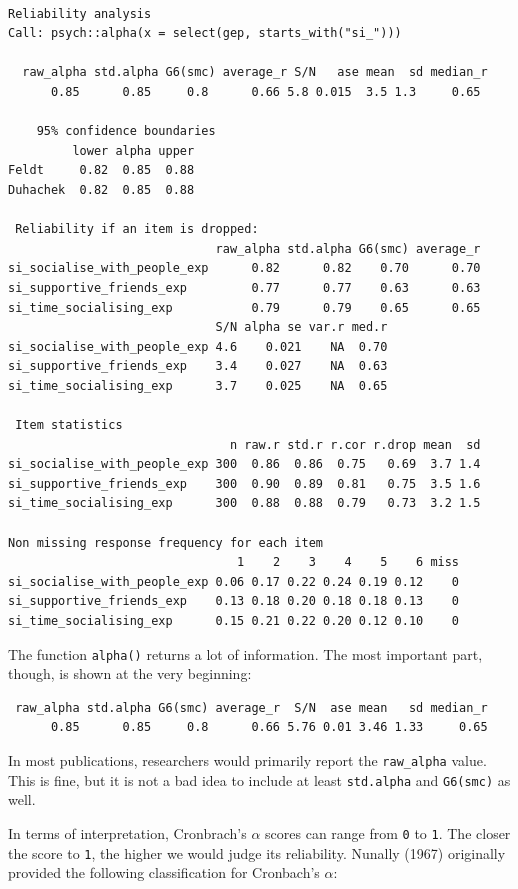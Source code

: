 \documentclass[
  letterpaper,
]{krantz}
\begin{document}
\begin{verbatim}

Reliability analysis   
Call: psych::alpha(x = select(gep, starts_with("si_")))

  raw_alpha std.alpha G6(smc) average_r S/N   ase mean  sd median_r
      0.85      0.85     0.8      0.66 5.8 0.015  3.5 1.3     0.65

    95% confidence boundaries 
         lower alpha upper
Feldt     0.82  0.85  0.88
Duhachek  0.82  0.85  0.88

 Reliability if an item is dropped:
                             raw_alpha std.alpha G6(smc) average_r
si_socialise_with_people_exp      0.82      0.82    0.70      0.70
si_supportive_friends_exp         0.77      0.77    0.63      0.63
si_time_socialising_exp           0.79      0.79    0.65      0.65
                             S/N alpha se var.r med.r
si_socialise_with_people_exp 4.6    0.021    NA  0.70
si_supportive_friends_exp    3.4    0.027    NA  0.63
si_time_socialising_exp      3.7    0.025    NA  0.65

 Item statistics 
                               n raw.r std.r r.cor r.drop mean  sd
si_socialise_with_people_exp 300  0.86  0.86  0.75   0.69  3.7 1.4
si_supportive_friends_exp    300  0.90  0.89  0.81   0.75  3.5 1.6
si_time_socialising_exp      300  0.88  0.88  0.79   0.73  3.2 1.5

Non missing response frequency for each item
                                1    2    3    4    5    6 miss
si_socialise_with_people_exp 0.06 0.17 0.22 0.24 0.19 0.12    0
si_supportive_friends_exp    0.13 0.18 0.20 0.18 0.18 0.13    0
si_time_socialising_exp      0.15 0.21 0.22 0.20 0.12 0.10    0
\end{verbatim}

The function \texttt{alpha()} returns a lot of information. The most
important part, though, is shown at the very beginning:

\begin{verbatim}
 raw_alpha std.alpha G6(smc) average_r  S/N  ase mean   sd median_r
      0.85      0.85     0.8      0.66 5.76 0.01 3.46 1.33     0.65
\end{verbatim}

In most publications, researchers would primarily report the
\texttt{raw\_alpha} value. This is fine, but it is not a bad idea to
include at least \texttt{std.alpha} and \texttt{G6(smc)} as well.

In terms of interpretation, Cronbrach's \(\alpha\) scores can range from
\texttt{0} to \texttt{1}. The closer the score to \texttt{1}, the higher
we would judge its reliability. Nunally (1967) originally provided the
following classification for Cronbach's \(\alpha\):
\end{document}
